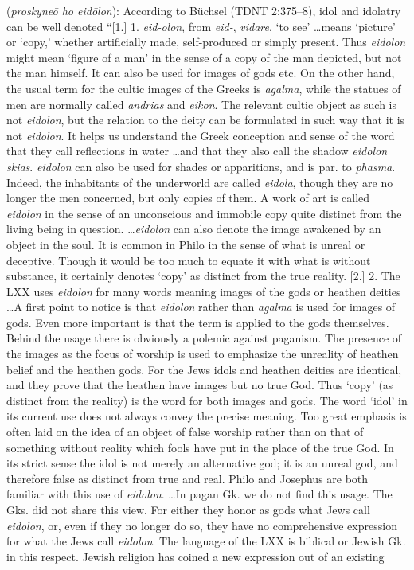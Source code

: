 \item[Idol worship,]

(\textit{proskyneō ho eidōlon}):
According to Büchsel (TDNT 2:375--8), idol and idolatry can be well denoted ``[1.] 1. \emph{eid-olon}, from \emph{eid-}, \emph{vidare}, `to see' \ldots means `picture' or `copy,' whether artificially made, self-produced or simply present. Thus \emph{eidolon} might mean `figure of a man' in the sense of a copy of the man depicted, but not the man himself. It can also be used for images of gods etc. On the other hand, the usual term for the cultic images of the Greeks is \emph{agalma}, while the statues of men are normally called \emph{andrias} and \emph{eikon}. The relevant cultic object as such is not \emph{eidolon}, but the relation to the deity can be formulated in such way that it is  not \emph{eidolon}. It helps us understand the Greek conception and sense of the word that they call reflections in water \ldots and that they also call the shadow \emph{eidolon skias}. \emph{eidolon} can also be used for shades or apparitions, and is par. to \emph{phasma}. Indeed, the inhabitants of the underworld are called \emph{eidola}, though they are no longer the men concerned, but only copies of them. A work of art is called \emph{eidolon} in the sense of an unconscious and immobile copy quite distinct from the living being in question. \ldots \emph{eidolon} can also denote the image awakened by an object in the soul. It is common in Philo in the sense of what is unreal or deceptive. Though it would be too much to equate it with what is without substance, it certainly denotes `copy' as distinct from the true reality. [2.] 2. The LXX uses \emph{eidolon} for many words meaning images of the gods or heathen deities \ldots A first point to notice is that \emph{eidolon} rather than \emph{agalma} is used for images of gods. Even more important is that the term is applied to the gods themselves. Behind the usage there is obviously a polemic against paganism. The presence of the images as the focus of worship is used to emphasize the unreality of heathen belief and the heathen gods. For the Jews idols and heathen deities are identical, and they prove that the heathen have images but no true God. Thus `copy' (as distinct from the reality) is the word for both images and gods. The word `idol' in its current use does not always convey the precise meaning. Too great emphasis is often laid on the idea of an object of false worship rather than on that of something without reality which fools have put in the place of the true God. In its strict sense the idol is not merely an alternative god; it is an unreal god, and therefore false as distinct from true and real. Philo and Josephus are both familiar with this use of \emph{eidolon}. \ldots In pagan Gk. we do not find this usage. The Gks. did not share this view. For either they honor as gods what Jews call \emph{eidolon}, or, even if they no longer do so, they have no comprehensive expression for what the Jews call \emph{eidolon}. The language of the LXX is biblical or Jewish Gk. in this respect. Jewish religion has coined a new expression out of an existing 